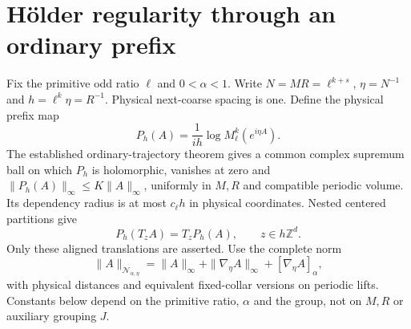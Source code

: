 \section{H\"older regularity through an ordinary prefix}
\label{pgh-section}

Fix the primitive odd ratio $\ell$ and $0<\alpha<1$. Write
$N=MR=\ell^{k+s}$, $\eta=N^{-1}$ and $h=\ell^k\eta=R^{-1}$.
Physical next-coarse spacing is one. Define the physical prefix map
\begin{equation}
 P_h(A)=\frac1{ih}\log M_\ell^k(e^{i\eta A}).
 \label{pgh-prefix}
\end{equation}
The established ordinary-trajectory theorem gives a common complex
supremum ball on which $P_h$ is holomorphic, vanishes at zero and
$\|P_h(A)\|_\infty\le K\|A\|_\infty$, uniformly in $M,R$ and
compatible periodic volume. Its dependency radius is at most
$c_\ell h$ in physical coordinates. Nested centered partitions give
\begin{equation}
 P_h(T_zA)=T_zP_h(A),\qquad z\in h\mathbb Z^d.
 \label{pgh-covariance}
\end{equation}
Only these aligned translations are asserted. Use the complete norm
\[
 \|A\|_{\mathcal N_{\alpha,\eta}}
 =\|A\|_\infty+\|\nabla_\eta A\|_\infty
                         +[\nabla_\eta A]_\alpha,
\]
with physical distances and equivalent fixed-collar versions on
periodic lifts. Constants below depend on the primitive ratio,
$\alpha$ and the group, not on $M,R$ or auxiliary grouping $J$.

